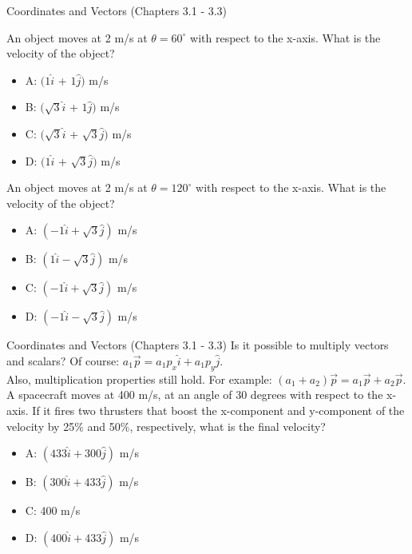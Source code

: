 \documentclass{beamer}
\begin{document}
\begin{frame}{Coordinates and Vectors (Chapters 3.1 - 3.3)}
\small
\begin{minipage}[b]{0.45\linewidth}
An object moves at 2 m/s at $\theta = 60^{\circ}$ with respect to the x-axis.  What is the velocity of the object?
\vspace{0.2cm}
\begin{itemize}
\item A: $(1\hat{i}$ + $1\hat{j})$  m/s
\item B: $(\sqrt{3}\hat{i}$ + $1\hat{j})$  m/s
\item C: $(\sqrt{3}\hat{i}$ + $\sqrt{3}\hat{j})$  m/s
\item D: $(1\hat{i}$ + $\sqrt{3}\hat{j})$  m/s
\end{itemize}
\end{minipage}
\hspace{0.5cm}
\begin{minipage}[b]{0.45\linewidth}
An object moves at 2 m/s at $\theta = 120^{\circ}$ with respect to the x-axis.  What is the velocity of the object?
\vspace{0.2cm}
\begin{itemize}
\item A: $(-1\hat{i} + \sqrt{3}\hat{j})$ m/s
\item B: $(1\hat{i} - \sqrt{3}\hat{j})$ m/s
\item C: $(-1\hat{i} + \sqrt{3}\hat{j})$ m/s
\item D: $(-1\hat{i} - \sqrt{3}\hat{j})$ m/s
\end{itemize}
\end{minipage}
\end{frame}

\begin{frame}{Coordinates and Vectors (Chapters 3.1 - 3.3)}
Is it possible to multiply vectors and scalars?  Of course: $a_1\vec{p} = a_1p_x\hat{i}+a_1p_y\hat{j}$.\\
\vspace{0.2cm}
Also, multiplication properties still hold.  For example: $(a_1+a_2)\vec{p} = a_1\vec{p}+a_2\vec{p}$. \\
\vspace{0.2cm}
\small
A spacecraft moves at 400 m/s, at an angle of 30 degrees with respect to the x-axis.  If it fires two thrusters that boost the x-component and y-component of the velocity by 25\% and 50\%, respectively, what is the final velocity?
\begin{itemize}
\item A: $(433\hat{i}+300\hat{j})$ m/s
\item B: $(300\hat{i}+433\hat{j})$ m/s
\item C: 400 m/s
\item D: $(400\hat{i}+433\hat{j})$ m/s
\end{itemize}
\end{frame}
\end{document}

